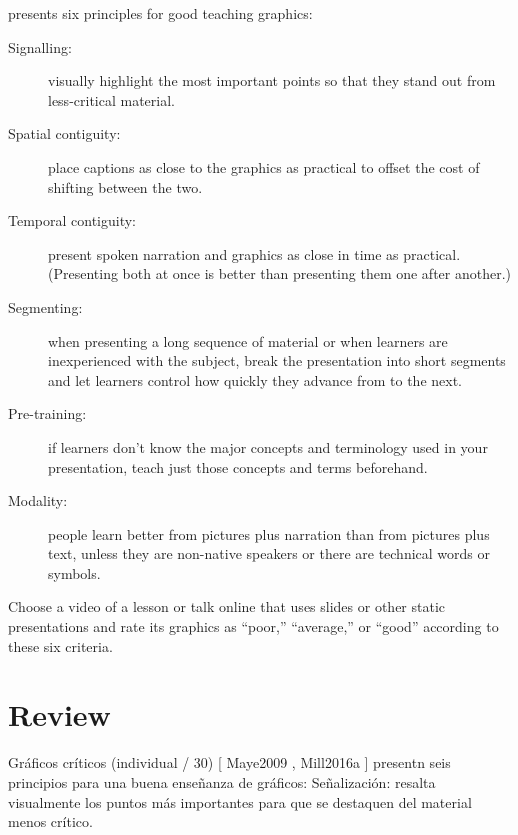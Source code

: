 {

\cite{Maye2009,Mill2016a} presents six principles for good teaching graphics:

\begin{description}

\item[Signalling:]
  visually highlight the most important points
  so that they stand out from less-critical material.

\item[Spatial contiguity:]
  place captions as close to the graphics as practical to offset the cost of shifting between the two.

\item[Temporal contiguity:]
  present spoken narration and graphics as close in time as practical.
  (Presenting both at once is better than presenting them one after another.)

\item[Segmenting:]
  when presenting a long sequence of material or when learners are inexperienced with the subject,
  break the presentation into short segments
  and let learners control how quickly they advance from to the next.

\item[Pre-training:]
  if learners don't know the major concepts and terminology used in your presentation,
  teach just those concepts and terms beforehand.

\item[Modality:]
  people learn better from pictures plus narration than from pictures plus text,
  unless they are non-native speakers
  or there are technical words or symbols.

\end{description}

Choose a video of a lesson or talk online that uses slides or other static presentations
and rate its graphics as ``poor,'' ``average,'' or ``good'' according to these six criteria.

\section*{Review}


Gráficos críticos (individual / 30)
[ Maye2009 , Mill2016a ] presentn seis principios para una buena enseñanza de gráficos:
Señalización:
resalta visualmente los puntos más importantes para que se destaquen del material menos crítico.
 
}
